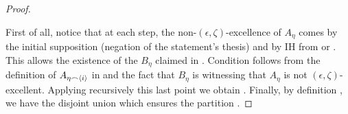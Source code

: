 \begin{lemma}
\begin{proof}
\begin{enumerate}[label={\Roman*}., ref={\Roman*}, font=\rmfamily]
                \end{enumerate}
                First of all, notice that at each step, the non-$(\epsilon, \zeta)$-excellence of $A_\eta$ comes by the initial supposition
                (negation of the statement's thesis) and by IH
                from  or .
                This allows the existence of the $B_\eta$ claimed in .
                Condition  follows from the definition of $A_{\eta \frown \left< i \right>}$ in
                 and the fact that $B_\eta$ is witnessing that $A_\eta$ is not $(\epsilon, \zeta)$-excellent.
                Applying recursively this last point we obtain .
                Finally, by definition , we have the disjoint union
                 which ensures
                the partition .


\end{proof}
\end{lemma}
